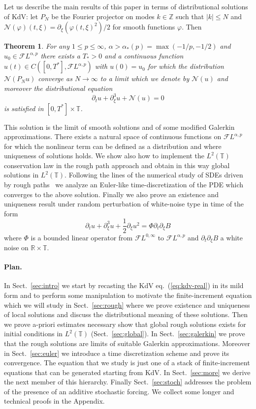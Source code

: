 \documentclass[a4paper,11pt,reqno]{article}
\newcommand{\RR}{\mathbb{R}}
\newcommand{\TT}{\mathbb{T}}
\newcommand{\FF}{\mathcal{F}}
\newcommand{\ZZ}{\mathbb{Z}}
\newtheorem{theorem}{Theorem}
\begin{document}
Let us describe the main results of this paper in terms of distributional solutions of KdV:
let $P_N$ be the Fourier projector on modes $k\in \ZZ$ such that $|k|\le N$ and $\mathcal{N}(\varphi)(t,\xi)=\partial_\xi (\varphi(t,\xi)^2)/2$ for smooth functions $\varphi$. 
 Then
\begin{theorem}
\label{th:main-intro}
For any $1 \le p \le \infty$, $\alpha > \alpha_{*}(p)=\max(-1/p,-1/2)$ and $u_0 \in \FF L^{\alpha,p}$ there exists a $T_* >0$ and a continuous function $u(t) \in C([0,T^*],\FF L^{\alpha,p})$ with $u(0) = u_0$ for which the distribution $\mathcal{N}(P_N u)$ converge as $N\to \infty$ to a limit which we denote by 
$\mathcal{N}(u)$ and moreover the distributional equation
$$
\partial_t u + \partial_\xi^3 u +  \mathcal{N}(u) = 0
$$
is satisfied in $[0, T^*]\times \TT$. 
\end{theorem}
This solution is the limit of smooth solutions and of some modified  Galerkin approximations. There exists a natural space of continuous functions on $\FF L^{\alpha,p}$ for which the nonlinear term can be defined as a distribution and where uniqueness of solutions holds. 
We show also how to implement the $L^2(\TT)$ conservation law in the rough path approach and obtain in this way global solutions in $L^2(\TT)$. 
Following the lines of the numerical study of SDEs driven by rough paths~\cite{davie,MR1470933,fveuler} we analyze an Euler-like time-discretization of the PDE which converges to the above solution. 
Finally we also prove an existence and uniqueness result under random perturbation of white-noise type in time of the form
\begin{equation*}
\partial_t u + \partial^3_\xi u +
\frac12 \partial_\xi u^2 = \Phi \partial_t  \partial_\xi B
\end{equation*}
where $\Phi$ is a bounded linear operator from $\FF L^{0,\infty}$ to $\FF L^{\alpha,p}$ and
$\partial_t \partial_\xi B$ a white noise on $\RR\times\TT$.

\bigskip
\paragraph{Plan.}
 In Sect.~\ref{sec:intro} we start by recasting the KdV
eq.~(\ref{eq:kdv-real}) in its mild form and to perform some
manipulation to motivate the finite-increment equation which we will study
in Sect.~\ref{sec:rough}  where we prove  existence and uniqueness of
local solutions and discuss the distributional meaning of these solutions.
 Then we prove a-priori estimates necessary
show that global rough solutions
exists for initial conditions in $L^2(\TT)$ (Sect.~\ref{sec:global}).
In
Sect.~\ref{sec:galerkin} we  prove that the rough solutions are
limits of suitable Galerkin approximations. Moreover in Sect.~\ref{sec:euler} we introduce a
time discretization scheme and prove its convergence.
 The
equation that we study is just one of a stack of finite-increment equations that can be
generated starting from KdV. In Sect.~\ref{sec:more} we derive the
next member of this hierarchy. Finally
Sect.~\ref{sec:stoch} addresses the problem of the presence of an
additive stochastic forcing.
%
We collect some longer and technical proofs in the Appendix.
\end{document}
